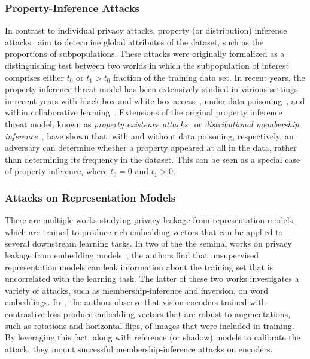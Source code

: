 

\subsubsection{Property-Inference Attacks} In contrast to individual privacy attacks, property (or distribution) inference attacks~\cite{ateniese-2015-property_inference} aim to determine global attributes of the dataset, such as the proportions of subpopulations. These attacks were originally formalized as a distinguishing test between two worlds in which the subpopulation of interest comprises either $t_0$ or $t_1 > t_0$ fraction of the training data set. In recent years, the property inference threat model has been extensively studied in various settings in recent years with black-box and white-box access~\cite{suri2023dissectingdistributioninference, zhou2022propinfGANS, ganju2018propinfpermutation, hartmann-2023-distributioninference}, under data poisoning~\cite{mahloujifar2022propertypoisoning, chaudhari-2022-snap}, and within collaborative learning~\cite{xu2020subjectpropinf, melis-2018-exploitingunintendedcollab}. Extensions of the original property inference threat model, known as \emph{property existence attacks}~\cite{chaudhari-2022-snap} or \emph{distributional membership inference}~\cite{hartmann-2023-distributioninference}, have shown that, with and without data poisoning, respectively, an adversary can determine whether a property appeared at all in the data, rather than determining its frequency in the dataset. This can be seen as a special case of property inference, where $t_{0} = 0$ and $t_1 > 0$.


\subsubsection{Attacks on Representation Models} There are multiple works studying privacy leakage from representation models, which are trained to produce rich embedding vectors that can be applied to several downstream learning tasks. In two of the the seminal works on privacy leakage from embedding models~\cite{song-2020-overlearning, song-2020-embeddingleakage}, the authors find that unsupervised representation models can leak information about the training set that is uncorrelated with the learning task. The latter of these two works investigates a variety of attacks, such as membership-inference and inversion, on word embeddings. In~\cite{liu2021encodermi}, the authors observe that vision encoders trained with contrastive loss produce embedding vectors that are robust to augmentations, such as rotations and horizontal flips, of images that were included in training. By leveraging this fact, along with reference (or shadow) models to calibrate the attack, they mount successful membership-inference attacks on encoders. 


